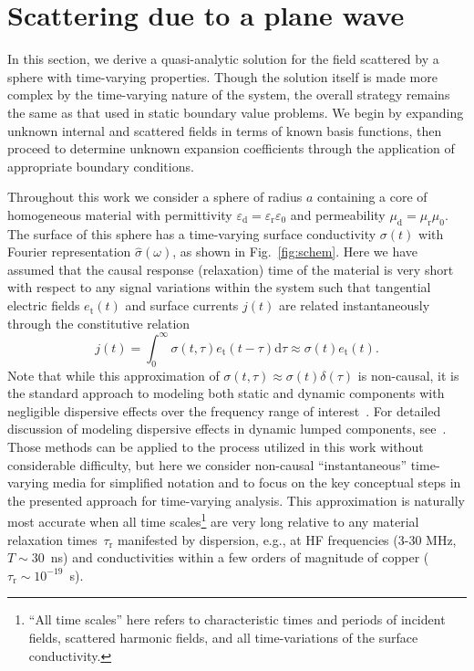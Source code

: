 \documentclass[article]{IEEEtran}
\newcommand{\T}[1]{\mathrm{#1}}
\begin{document}
\section{Scattering due to a plane wave}
\label{sec:pw}
In this section, we derive a quasi-analytic solution for the field scattered by a sphere with time-varying properties.  Though the solution itself is made more complex by the time-varying nature of the system, the overall strategy remains the same as that used in static boundary value problems.  We begin by expanding unknown internal and scattered fields in terms of known basis functions, then proceed to determine unknown expansion coefficients through the application of appropriate boundary conditions.

Throughout this work we consider a sphere of radius $a$ containing a core of homogeneous material with permittivity $\varepsilon_\T{d} = \varepsilon_\T{r}\varepsilon_0$ and permeability $\mu_\T{d} = \mu_\T{r}\mu_0$.  The surface of this sphere has a time-varying surface conductivity $\sigma(t)$ with Fourier representation $\hat{\sigma}(\omega)$, as shown in Fig.~\ref{fig:schem}.  Here we have assumed that the causal response (relaxation) time of the material is very short with respect to any signal variations within the system such that tangential electric fields $e_\T{t}(t)$ and surface currents $j(t)$ are related instantaneously through the constitutive relation 
\begin{equation}
    j(t) = \int_0^\infty \sigma(t,\tau)e_\T{t}(t-\tau)\T{d}\tau \approx \sigma(t)e_\T{t}(t).
\end{equation}
Note that while this approximation of $\sigma(t,\tau)\approx \sigma(t)\delta(\tau)$ is non-causal, it is the standard approach to modeling both static and dynamic components with negligible dispersive effects over the frequency range of interest~\cite[\S 3.4.1]{maas2003nonlinear}. For detailed discussion of modeling dispersive effects in dynamic lumped components, see~\cite{jayathurathnage2021time}.  Those methods can be applied to the process utilized in this work without considerable difficulty, but here we consider non-causal ``instantaneous'' time-varying media for simplified notation and to focus on the key conceptual steps in the presented approach for time-varying analysis.  This approximation is naturally most accurate when all time scales\footnote{``All time scales'' here refers to characteristic times and periods of incident fields, scattered harmonic fields, and all time-variations of the surface conductivity.} are very long relative to any material relaxation times~$\tau_\T{r}$ manifested by dispersion, e.g., at HF frequencies (3-30 MHz, $T\sim30$~ns) and conductivities within a few orders of magnitude of copper ($\tau_\T{r}\sim10^{-19}$~s).
\end{document}
